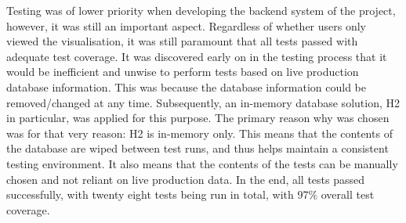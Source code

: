 Testing was of lower priority when developing the backend system of the project, however, it was still an important aspect.
Regardless of whether users only viewed the visualisation, it was still paramount that all tests passed with adequate test coverage.
It was discovered early on in the testing process that it would be inefficient and unwise to perform tests based on live production database information.
This was because the database information could be removed/changed at any time.
Subsequently, an in-memory database solution, H2 in particular, was applied for this purpose.
The primary reason why was chosen was for that very reason: H2 is in-memory only.
This means that the contents of the database are wiped between test runs, and thus helps maintain a consistent testing environment.
It also means that the contents of the tests can be manually chosen and not reliant on live production data.
In the end, all tests passed successfully, with twenty eight tests being run in total, with 97\% overall test coverage.
